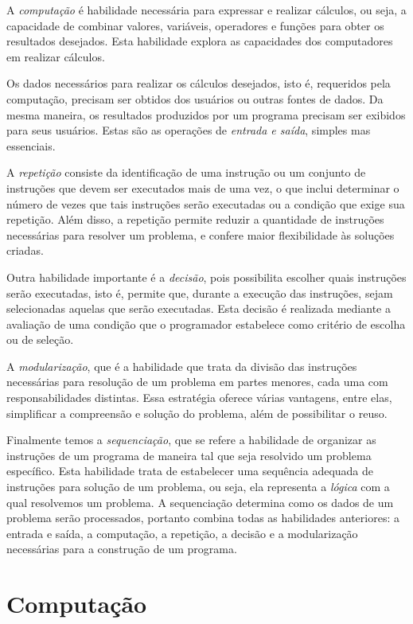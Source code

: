\documentclass[
]{book}
\begin{document}
A \emph{computação} é habilidade necessária para expressar e realizar cálculos, ou seja, a capacidade de combinar valores, variáveis, operadores e funções para obter os resultados desejados. Esta habilidade explora as capacidades dos computadores em realizar cálculos.

Os dados necessários para realizar os cálculos desejados, isto é, requeridos pela computação, precisam ser obtidos dos usuários ou outras fontes de dados. Da mesma maneira, os resultados produzidos por um programa precisam ser exibidos para seus usuários. Estas são as operações de \emph{entrada e saída}, simples mas essenciais.

A \emph{repetição} consiste da identificação de uma instrução ou um conjunto de instruções que devem ser executados mais de uma vez, o que inclui determinar o número de vezes que tais instruções serão executadas ou a condição que exige sua repetição. Além disso, a repetição permite reduzir a quantidade de instruções necessárias para resolver um problema, e confere maior flexibilidade às soluções criadas.

Outra habilidade importante é a \emph{decisão}, pois possibilita escolher quais instruções serão executadas, isto é, permite que, durante a execução das instruções, sejam selecionadas aquelas que serão executadas. Esta decisão é realizada mediante a avaliação de uma condição que o programador estabelece como critério de escolha ou de seleção.

A \emph{modularização}, que é a habilidade que trata da divisão das instruções necessárias para resolução de um problema em partes menores, cada uma com responsabilidades distintas. Essa estratégia oferece várias vantagens, entre elas, simplificar a compreensão e solução do problema, além de possibilitar o reuso.

Finalmente temos a \emph{sequenciação}, que se refere a habilidade de organizar as instruções de um programa de maneira tal que seja resolvido um problema específico. Esta habilidade trata de estabelecer uma sequência adequada de instruções para solução de um problema, ou seja, ela representa a \emph{lógica} com a qual resolvemos um problema. A sequenciação determina como os dados de um problema serão processados, portanto combina todas as habilidades anteriores: a entrada e saída, a computação, a repetição, a decisão e a modularização necessárias para a construção de um programa.

\hypertarget{comput}{%
\chapter{Computação}\label{comput}}
\end{document}
